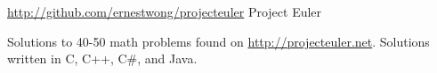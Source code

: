 \begin{cventries}

  \cventry
    {\href{http://github.com/ernestwong/projecteuler}{http://github.com/ernestwong/projecteuler}} %
    {Project Euler} %
    {} %
    {} %
    {
      \begin{cvitems} %
        \item {Solutions to 40-50 math problems found on \href{http://projecteuler.net}{http://projecteuler.net}. Solutions written in C, C++, C\#, and Java.}
      \end{cvitems}
    }

\end{cventries}
